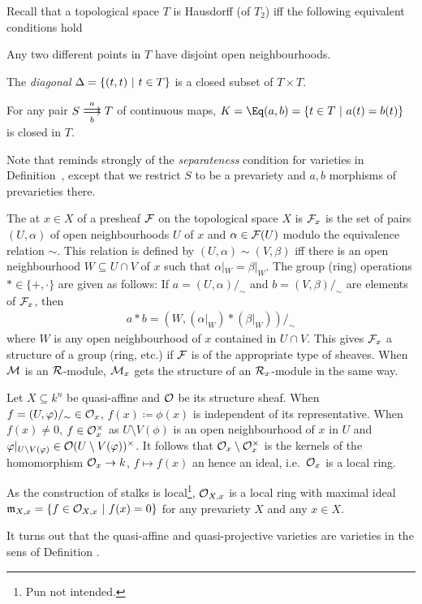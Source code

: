 \documentclass[a4paper,parskip=half,numbers=enddot, DIV=12]{scrreprt}
\begin{document}
\begin{rem}
    Recall that a topological space $T$ is  Hausdorff (of $T_2$) iff the following equivalent conditions hold
    \begin{alphanumerate}
        \item 
            Any two different points in $T$ have disjoint open neighbourhoods.
        \item 
            The \emph{diagonal} $\Delta = \left\{ (t,t)\ \middle|\  t\in T\right\}$ is a closed subset of $T\times T$.
        \item 
            For any pair $S\doublemorphism[a][\smash{b}] T$ of continuous maps, $K = \Eq(a,b) =\left\{t\in T\st a(t) = b(t)\right\}$ is closed in $T$.
    \end{alphanumerate}
    Note that  reminds strongly of the \emph{separateness} condition for varieties in Definition~, except that we restrict $S$ to be a prevariety and $a,b$ morphisms of prevarieties there.
\end{rem}
\begin{defi}[Stalk]
    The  at $x\in X$ of a presheaf $\mathcal{F}$ on the topological space $X$ is $\mathcal{F}_x$ is the set of pairs $(U,\alpha)$ of open neighbourhoods $U$ of $x$ and $\alpha\in \mathcal{F}(U)$ modulo the equivalence relation $\sim$. This relation is defined by $(U,\alpha)\sim (V, \beta)$ iff there is an open neighbourhood $W\subseteq U\cap V$ of $x$ such that $\alpha|_W = \beta|_W$. The group (ring) operations $*\in \{+,\cdot\}$ are given as follows: If $a= (U,\alpha)/_\sim$ and $b= (V,\beta)/_\sim$ are elements of $\mathcal{F}_x$, then 
    \begin{align*}
        a* b = (W, (\alpha|_W)*(\beta|_W))/_\sim
    \end{align*}
    where $W$ is any open neighbourhood of $x$ contained in $U\cap V$. This gives $\mathcal{F}_x$ a structure of a group (ring, etc.) if $\mathcal{F}$ is of the appropriate type of sheaves. When $\mathcal{M}$ is an $\mathcal{R}$-module, $\mathcal{M}_x$ gets the structure of an $\mathcal{R}_x$-module in the same way.
\end{defi}
\begin{rem}
    Let $X\subseteq k^n$ be quasi-affine and $\mathcal{O}$ be its structure sheaf. When $f=(U,\varphi)/_\sim\in \mathcal{O}_x$, $f(x)\coloneqq \phi(x)$ is independent of its representative. When $f(x)\neq 0$, $f\in \mathcal{O}_x^\times$ as $U\setminus V(\phi)$ is an open neighbourhood of $x$ in $U$ and $\varphi|_{U\setminus V(\varphi)} \in \mathcal{O}(U\setminus V(\varphi))^\times$. It follows that $\mathcal{O}_x\setminus\mathcal{O}_x^\times$ is the kernels of the homomorphism $\Oo_x \morphism k$, $f\mapsto f(x)$ an hence an ideal, i.e.\ $\mathcal{O}_x$ is a local ring. 
    
    As the construction of stalks is local\footnote{Pun not intended.}, $\mathcal{O}_{X,x}$ is a local ring with maximal ideal $\mathfrak{m}_{X,x} = \left\{f\in \mathcal{O}_{X,x}\ \middle|\  f(x) = 0\right\}$ for any prevariety $X$ and any $x\in X$. 
\end{rem}
\begin{rem}
    It turns out that the quasi-affine and quasi-projective varieties are varieties in the sens of Definition .
\end{rem}
\printbibliography
\end{document}
